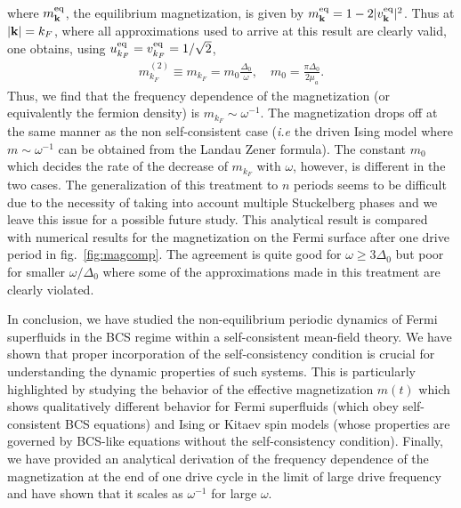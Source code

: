 \documentclass[a4paper,10pt]{report}
\begin{document}
where $m^{\rm eq}_{\bf k}$, the equilibrium magnetization, is given
by $m^{\rm eq}_{\bf k}=1-2|v^{\rm eq}_{\bf k}|^2$. Thus at $|{\bf
k}|=k_F$, where all approximations used to arrive at this result are
clearly valid, one obtains, using $u_{k_F}^{\rm eq} = v_{k_F}^{\rm
eq}=1/\sqrt{2}$,
\begin{eqnarray}
m^{(2)}_{k_F} \equiv m_{k_F} = m_0 \frac{\Delta_0}{\omega}, \quad
m_0 = \frac{\pi \Delta_0}{2 \mu_a}. \label{meqfinal}
\end{eqnarray}
Thus, we find that the frequency dependence of the magnetization (or
equivalently the fermion density) is $m_{k_F} \sim\omega^{-1}$. The
magnetization drops off at the same manner as the non
self-consistent case (\textit{i.e} the driven Ising model where
$m\sim\omega^{-1}$ can be obtained from the Landau Zener formula).
The constant $m_0$ which decides the rate of the decrease of
$m_{k_F}$ with $\omega$, however, is different in the two cases. The generalization of this treatment to $n$ periods
seems to be difficult due to the necessity of taking into account
multiple Stuckelberg phases and we leave this issue for a possible
future study. This analytical result is compared with numerical results for the magnetization on the
Fermi surface after one drive period in fig.\ \ref{fig:magcomp}. The agreement is quite good for $\omega \ge 3
\Delta_0$ but poor for smaller $\omega/\Delta_0$ where some of the
approximations made in this treatment are clearly violated.
 
In conclusion, we have studied the non-equilibrium periodic dynamics of Fermi superfluids in the BCS regime
within a self-consistent mean-field theory. We have shown that proper incorporation of the self-consistency
condition is crucial for understanding the dynamic properties of such systems. This is particularly highlighted by
studying the behavior of the effective magnetization $m(t)$ which shows qualitatively different
behavior for Fermi superfluids (which obey self-consistent BCS equations) and Ising or Kitaev spin models (whose properties are governed by BCS-like equations without the self-consistency condition). Finally, we have provided an analytical derivation of the frequency dependence of the magnetization at the end
of one drive cycle in the limit of large drive frequency and have shown that it scales as $\omega^{-1}$ for large $\omega$. 
\end{document}
